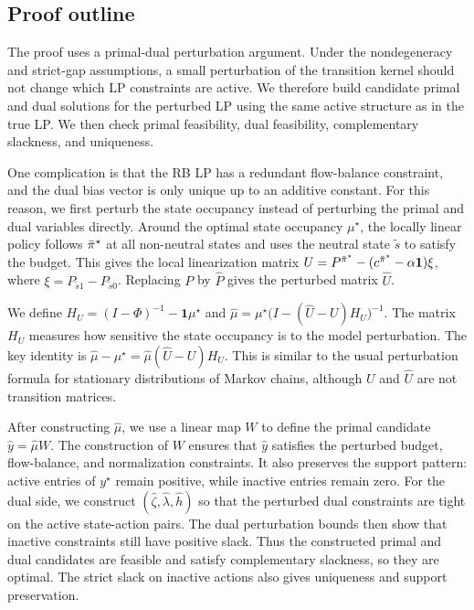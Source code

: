 \documentclass[mnsc,nonblindrev]{informs3}
\newcommand{\Phat}{\widehat{P}}
\newcommand{\one}{\mathbf{1}}
\newcommand{\pibst}{\Bar{\pi}^\star}
\newcommand{\hhat}{\widehat{h}}
\newcommand{\muhat}{\widehat{\mu}}
\newcommand{\uhat}{\widehat{U}}
\newcommand{\yhat}{\widehat{y}}
\newcommand{\zetahat}{\widehat{\zeta}}
\newcommand{\lambdahat}{\widehat{\lambda}}
\begin{document}
\subsection{Proof outline}\label{sec:pr-outline-pert}
The proof uses a primal-dual perturbation argument. Under the
nondegeneracy and strict-gap assumptions, a small perturbation of the
transition kernel should not change which LP constraints are active. We
therefore build candidate primal and dual solutions for the perturbed LP
using the same active structure as in the true LP. We then check primal
feasibility, dual feasibility, complementary slackness, and uniqueness.

One complication is that the RB LP has a redundant flow-balance constraint,
and the dual bias vector is only unique up to an additive constant. For
this reason, we first perturb the state occupancy instead of perturbing
the primal and dual variables directly. Around the optimal state occupancy
\(\mu^\star\), the locally linear policy follows \(\pibst\) at all
non-neutral states and uses the neutral state \(\tilde s\) to satisfy the
budget. This gives the local linearization matrix
\(U=P^{\pibst}-(c^{\pibst}-\alpha\one)\xi\), where
\(\xi=P_{\tilde s1}-P_{\tilde s0}\). Replacing \(P\) by \(\Phat\) gives
the perturbed matrix \(\uhat\).

We define \(H_U=(I-\Phi)^{-1}-\one\mu^\star\) and
\(
    \muhat
    =
    \mu^\star\bigl(I-(\uhat-U)H_U\bigr)^{-1}.
\)
The matrix \(H_U\) measures how sensitive the state occupancy is to the
model perturbation. The key identity is
\(
    \muhat-\mu^\star=\muhat(\uhat-U)H_U.
\)
This is similar to the usual perturbation formula for stationary
distributions of Markov chains, although \(U\) and \(\uhat\) are not
transition matrices.

After constructing \(\muhat\), we use a linear map \(W\) to define the
primal candidate \(\yhat=\muhat W\). The construction of \(W\) ensures that
\(\yhat\) satisfies the perturbed budget, flow-balance, and normalization
constraints. It also preserves the support pattern: active entries of
\(y^\star\) remain positive, while inactive entries remain zero.
For the dual side, we construct \((\zetahat,\lambdahat,\hhat)\) so that
the perturbed dual constraints are tight on the active state-action pairs.
The dual perturbation bounds then show that inactive constraints still
have positive slack. Thus the constructed primal and dual candidates are
feasible and satisfy complementary slackness, so they are optimal. The
strict slack on inactive actions also gives uniqueness and support
preservation.
\end{document}
